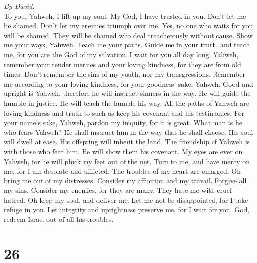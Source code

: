 \emph{By David.}\\
 To you, Yahweh, I lift up my soul.  My God,
I have trusted in you. Don't let me be shamed. Don't let my enemies
triumph over me.  Yes, no one who waits for you will be
shamed. They will be shamed who deal treacherously without cause.
 Show me your ways, Yahweh. Teach me your paths.
 Guide me in your truth, and teach me, for you are the God
of my salvation. I wait for you all day long.  Yahweh,
remember your tender mercies and your loving kindness, for they are from
old times.  Don't remember the sins of my youth, nor my
transgressions. Remember me according to your loving kindness, for your
goodness' sake, Yahweh.  Good and upright is Yahweh,
therefore he will instruct sinners in the way.  He will
guide the humble in justice. He will teach the humble his way.
 All the paths of Yahweh are loving kindness and truth to
such as keep his covenant and his testimonies.  For your
name's sake, Yahweh, pardon my iniquity, for it is great.
 What man is he who fears Yahweh? He shall instruct him
in the way that he shall choose.  His soul will dwell at
ease. His offspring will inherit the land.  The
friendship of Yahweh is with those who fear him. He will show them his
covenant.  My eyes are ever on Yahweh, for he will pluck
my feet out of the net.  Turn to me, and have mercy on
me, for I am desolate and afflicted.  The troubles of my
heart are enlarged. Oh bring me out of my distresses. 
Consider my affliction and my travail. Forgive all my sins.
 Consider my enemies, for they are many. They hate me
with cruel hatred.  Oh keep my soul, and deliver me. Let
me not be disappointed, for I take refuge in you.  Let
integrity and uprightness preserve me, for I wait for you.
 God, redeem Israel out of all his troubles.

\hypertarget{section-25}{%
\section{26}\label{section-25}}

